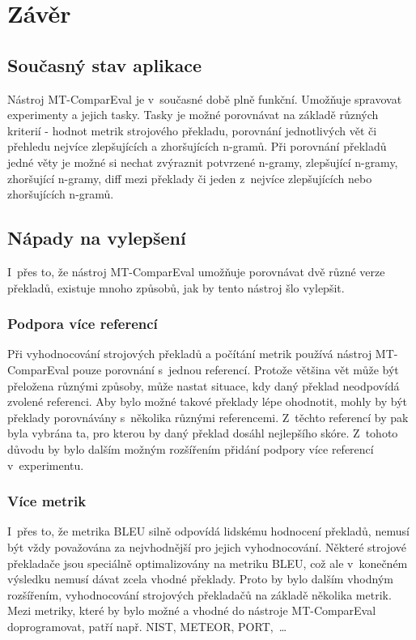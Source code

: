 \chapter{Závěr}

\section{Současný stav aplikace}
Nástroj \mbox{MT-ComparEval} je v~současné době plně funkční.
Umožňuje spravovat experimenty a jejich tasky.
Tasky je možné porovnávat na základě různých kriterií -
  hodnot metrik strojového překladu,
  porovnání jednotlivých vět
  či přehledu nejvíce zlepšujících a zhoršujících \mbox{n-gramů}.
Při porovnání překladů jedné věty je možné si nechat zvýraznit
  potvrzené \mbox{n-gramy}, zlepšující \mbox{n-gramy}, zhoršující \mbox{n-gramy}, diff mezi překlady
  či jeden z~nejvíce zlepšujících nebo zhoršujících \mbox{n-gramů}.


\section{Nápady na vylepšení}
I~přes to, že nástroj \mbox{MT-ComparEval} umožňuje porovnávat dvě různé verze překladů,
  existuje mnoho způsobů,
  jak by tento nástroj šlo vylepšit.

\subsection{Podpora více referencí}
Při vyhodnocování strojových překladů a počítání metrik používá nástroj \mbox{MT-ComparEval} pouze porovnání s~jednou referencí.
Protože většina vět může být přeložena různými způsoby,
  může nastat situace,
  kdy daný překlad neodpovídá zvolené referenci.
Aby bylo možné takové překlady lépe ohodnotit,
  mohly by být překlady porovnávány s~několika různými referencemi.
Z~těchto referencí by pak byla vybrána ta,
  pro kterou by daný překlad dosáhl nejlepšího skóre.
Z~tohoto důvodu by bylo dalším možným rozšířením přidání podpory více referencí v~experimentu.

\subsection{Více metrik}
I~přes to, že metrika BLEU silně odpovídá lidskému hodnocení překladů,
  nemusí být vždy považována za nejvhodnější pro jejich vyhodnocování.
Některé strojové překladače jsou speciálně optimalizovány na metriku BLEU,
  což ale v~konečném výsledku nemusí dávat zcela vhodné překlady.
Proto by bylo dalším vhodným rozšířením,
  vyhodnocování strojových překladačů na základě několika metrik.
Mezi metriky,
  které by bylo možné a vhodné do nástroje \mbox{MT-ComparEval} doprogramovat,
  patří např. NIST, METEOR, PORT,~\dots

